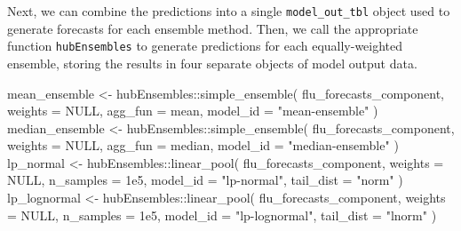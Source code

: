 \documentclass[
]{article}
\newenvironment{Shaded}{\begin{snugshade}}{\end{snugshade}}
\newcommand{\AttributeTok}[1]{\textcolor[rgb]{0.40,0.45,0.13}{#1}}
\newcommand{\ConstantTok}[1]{\textcolor[rgb]{0.56,0.35,0.01}{#1}}
\newcommand{\FloatTok}[1]{\textcolor[rgb]{0.68,0.00,0.00}{#1}}
\newcommand{\FunctionTok}[1]{\textcolor[rgb]{0.28,0.35,0.67}{#1}}
\newcommand{\NormalTok}[1]{\textcolor[rgb]{0.00,0.23,0.31}{#1}}
\newcommand{\OtherTok}[1]{\textcolor[rgb]{0.00,0.23,0.31}{#1}}
\newcommand{\SpecialCharTok}[1]{\textcolor[rgb]{0.37,0.37,0.37}{#1}}
\newcommand{\StringTok}[1]{\textcolor[rgb]{0.13,0.47,0.30}{#1}}
\begin{document}
Next, we can combine the predictions into a single
\texttt{model\_out\_tbl} object used to generate forecasts for each
ensemble method. Then, we call the appropriate function
\texttt{hubEnsembles} to generate predictions for each equally-weighted
ensemble, storing the results in four separate objects of model output
data.

\begin{Shaded}
\begin{Highlighting}[]
\NormalTok{mean\_ensemble }\OtherTok{\textless{}{-}}\NormalTok{ hubEnsembles}\SpecialCharTok{::}\FunctionTok{simple\_ensemble}\NormalTok{(}
\NormalTok{  flu\_forecasts\_component,}
  \AttributeTok{weights =} \ConstantTok{NULL}\NormalTok{,}
  \AttributeTok{agg\_fun =}\NormalTok{ mean,}
  \AttributeTok{model\_id =} \StringTok{"mean{-}ensemble"}
\NormalTok{)}
\NormalTok{median\_ensemble }\OtherTok{\textless{}{-}}\NormalTok{ hubEnsembles}\SpecialCharTok{::}\FunctionTok{simple\_ensemble}\NormalTok{(}
\NormalTok{  flu\_forecasts\_component,}
    \AttributeTok{weights =} \ConstantTok{NULL}\NormalTok{,}
    \AttributeTok{agg\_fun =}\NormalTok{ median,}
    \AttributeTok{model\_id =} \StringTok{"median{-}ensemble"}
\NormalTok{  )}
\NormalTok{lp\_normal }\OtherTok{\textless{}{-}}\NormalTok{ hubEnsembles}\SpecialCharTok{::}\FunctionTok{linear\_pool}\NormalTok{(}
\NormalTok{  flu\_forecasts\_component,}
  \AttributeTok{weights =} \ConstantTok{NULL}\NormalTok{,}
  \AttributeTok{n\_samples =} \FloatTok{1e5}\NormalTok{,}
  \AttributeTok{model\_id =} \StringTok{"lp{-}normal"}\NormalTok{,}
  \AttributeTok{tail\_dist =} \StringTok{"norm"}
\NormalTok{)}
\NormalTok{lp\_lognormal }\OtherTok{\textless{}{-}}\NormalTok{ hubEnsembles}\SpecialCharTok{::}\FunctionTok{linear\_pool}\NormalTok{(}
\NormalTok{  flu\_forecasts\_component,}
  \AttributeTok{weights =} \ConstantTok{NULL}\NormalTok{,}
  \AttributeTok{n\_samples =} \FloatTok{1e5}\NormalTok{,}
  \AttributeTok{model\_id =} \StringTok{"lp{-}lognormal"}\NormalTok{,}
  \AttributeTok{tail\_dist =} \StringTok{"lnorm"}
\NormalTok{) }
\end{Highlighting}
\end{Shaded}
\end{document}
